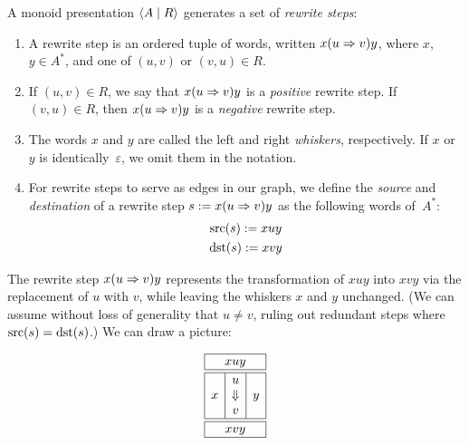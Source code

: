 \documentclass[../generics]{subfiles}
\begin{document}
\begin{definition}\label{rewrite step def} A monoid presentation $\langle A \mid R\rangle$ generates a set of \emph{rewrite steps}:
\begin{enumerate}
\item A rewrite step is an ordered tuple of words, written $x(u\Rightarrow v)y$, where $x$, $y\in A^*$, and one of $(u,v)$ or $(v,u)\in R$.
\item If $(u,v)\in R$, we say that $x(u\Rightarrow v)y$ is a \emph{positive} rewrite step. If $(v,u)\in R$, then $x(u\Rightarrow v)y$ is a \emph{negative} rewrite step.
\item The words $x$ and $y$ are called the left and right \emph{whiskers}, respectively. If $x$ or $y$ is identically~$\varepsilon$, we omit them in the notation.
\item For rewrite steps to serve as edges in our graph, we define the \emph{source} and \emph{destination} of a rewrite step $s:= x(u\Rightarrow v)y$ as the following words of~$A^*$:
\begin{gather*}
\operatorname{src}(s) := xuy\\
\operatorname{dst}(s) := xvy
\end{gather*}
\end{enumerate}
\end{definition}

The rewrite step $x(u\Rightarrow v)y$ represents the transformation of $xuy$ into $xvy$ via the replacement of $u$ with $v$, while leaving the whiskers $x$ and $y$ unchanged. (We can assume without loss of generality that $u\neq v$, ruling out redundant steps where $\operatorname{src}(s)=\operatorname{dst}(s)$.) We can draw a picture:
\begin{ceqn}
\[
\begin{array}{|c|c|c|}
\hline
\multicolumn{3}{|c|}{xuy}\\
\hline
\hline
&u&\\
x&\Downarrow&y\\
&v&\\
\hline
\hline
\multicolumn{3}{|c|}{xvy}\\
\hline
\end{array}
\]
\end{ceqn}
\end{document}
